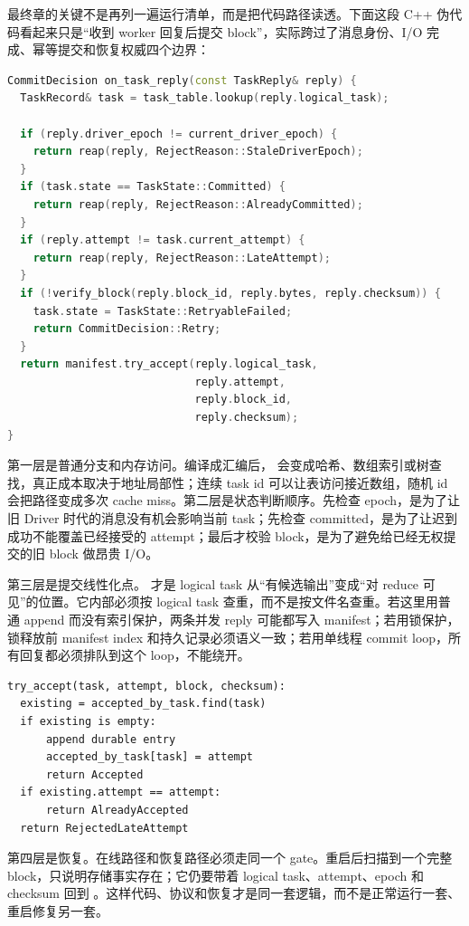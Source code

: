 最终章的关键不是再列一遍运行清单，而是把代码路径读透。下面这段 C++ 伪代码看起来只是“收到 worker 回复后提交 block”，实际跨过了消息身份、I/O 完成、幂等提交和恢复权威四个边界：

\begin{lstlisting}[language=C++,caption={Driver 提交路径的最小形状}]
CommitDecision on_task_reply(const TaskReply& reply) {
  TaskRecord& task = task_table.lookup(reply.logical_task);

  if (reply.driver_epoch != current_driver_epoch) {
    return reap(reply, RejectReason::StaleDriverEpoch);
  }
  if (task.state == TaskState::Committed) {
    return reap(reply, RejectReason::AlreadyCommitted);
  }
  if (reply.attempt != task.current_attempt) {
    return reap(reply, RejectReason::LateAttempt);
  }
  if (!verify_block(reply.block_id, reply.bytes, reply.checksum)) {
    task.state = TaskState::RetryableFailed;
    return CommitDecision::Retry;
  }
  return manifest.try_accept(reply.logical_task,
                             reply.attempt,
                             reply.block_id,
                             reply.checksum);
}
\end{lstlisting}

第一层是普通分支和内存访问。编译成汇编后， 会变成哈希、数组索引或树查找，真正成本取决于地址局部性；连续 task id 可以让表访问接近数组，随机 id 会把路径变成多次 cache miss。第二层是状态判断顺序。先检查 epoch，是为了让旧 Driver 时代的消息没有机会影响当前 task；先检查 committed，是为了让迟到成功不能覆盖已经接受的 attempt；最后才校验 block，是为了避免给已经无权提交的旧 block 做昂贵 I/O。

第三层是提交线性化点。 才是 logical task 从“有候选输出”变成“对 reduce 可见”的位置。它内部必须按 logical task 查重，而不是按文件名查重。若这里用普通 append 而没有索引保护，两条并发 reply 可能都写入 manifest；若用锁保护，锁释放前 manifest index 和持久记录必须语义一致；若用单线程 commit loop，所有回复都必须排队到这个 loop，不能绕开。

\begin{lstlisting}[numbers=none,caption={manifest gate 的语义，不是文件追加技巧}]
try_accept(task, attempt, block, checksum):
  existing = accepted_by_task.find(task)
  if existing is empty:
      append durable entry
      accepted_by_task[task] = attempt
      return Accepted
  if existing.attempt == attempt:
      return AlreadyAccepted
  return RejectedLateAttempt
\end{lstlisting}

第四层是恢复。在线路径和恢复路径必须走同一个 gate。重启后扫描到一个完整 block，只说明存储事实存在；它仍要带着 logical task、attempt、epoch 和 checksum 回到 。这样代码、协议和恢复才是同一套逻辑，而不是正常运行一套、重启修复另一套。

